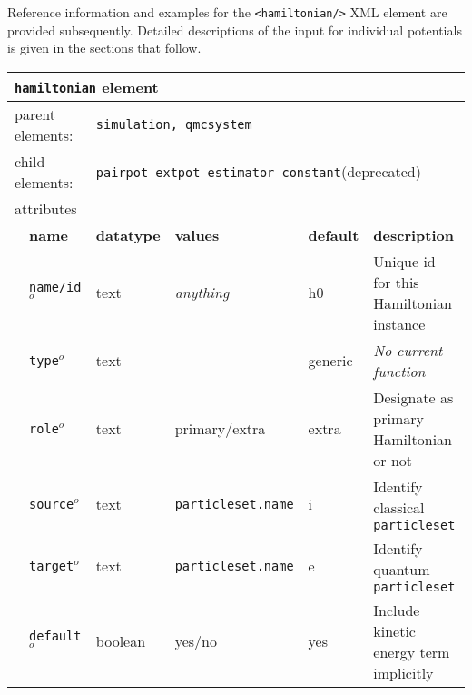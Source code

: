 Reference information and examples for the \texttt{<hamiltonian/>} XML element are provided subsequently.  Detailed descriptions of the input for individual potentials is given in the sections that follow.  


\FloatBarrier
\begin{table}[h]
\begin{center}
\begin{tabularx}{\textwidth}{l l l l l X }
\hline
\multicolumn{6}{l}{\texttt{hamiltonian} element} \\
\hline
\multicolumn{2}{l}{parent elements:} & \multicolumn{4}{l}{\texttt{simulation, qmcsystem}}\\
\multicolumn{2}{l}{child  elements:} & \multicolumn{4}{l}{\texttt{pairpot extpot estimator constant}(deprecated)}\\
\multicolumn{2}{l}{attributes}  & \multicolumn{4}{l}{}\\
   &   \bfseries name     & \bfseries datatype & \bfseries values & \bfseries default & \bfseries description \\
   & \texttt{name/id}$^o$ &  text              & \textit{anything}& h0                & Unique id for this Hamiltonian instance  \\
   & \texttt{type}$^o$    &  text              &                  & generic           & \textit{No current function}             \\
   & \texttt{role}$^o$    &  text              & primary/extra    & extra             & Designate as primary Hamiltonian or not  \\
   & \texttt{source}$^o$  &  text              & \texttt{particleset.name} & i        & Identify classical \texttt{particleset}           \\
   & \texttt{target}$^o$  &  text              & \texttt{particleset.name} & e        & Identify quantum \texttt{particleset}             \\
   & \texttt{default}$^o$ &  boolean           & yes/no           & yes               & Include kinetic energy term implicitly   \\
  \hline
\end{tabularx}
\end{center}
\end{table}
\FloatBarrier

